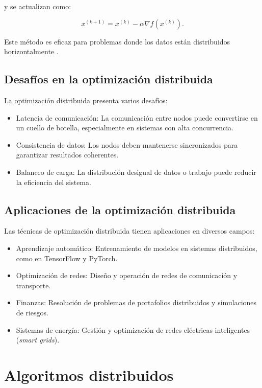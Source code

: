 \begin{itemize}
		y se actualizan como:
		
		\begin{equation}
			x^{(k+1)} = x^{(k)} - \alpha \nabla f(x^{(k)}).
		\end{equation}
		
		Este método es eficaz para problemas donde los datos están distribuidos horizontalmente \cite{recht2011hogwild}.
		
		\subsection{Desafíos en la optimización distribuida}
		
		La optimización distribuida presenta varios desafíos:
		
		\begin{itemize}
			\item Latencia de comunicación: La comunicación entre nodos puede convertirse en un cuello de botella, especialmente en sistemas con alta concurrencia.
			\item Consistencia de datos: Los nodos deben mantenerse sincronizados para garantizar resultados coherentes.
			\item Balanceo de carga: La distribución desigual de datos o trabajo puede reducir la eficiencia del sistema.
		\end{itemize}
		
		\subsection{Aplicaciones de la optimización distribuida}
		
		Las técnicas de optimización distribuida tienen aplicaciones en diversos campos:
		
		\begin{itemize}
			\item Aprendizaje automático: Entrenamiento de modelos en sistemas distribuidos, como en TensorFlow y PyTorch.
			\item Optimización de redes: Diseño y operación de redes de comunicación y transporte.
			\item Finanzas: Resolución de problemas de portafolios distribuidos y simulaciones de riesgos.
			\item Sistemas de energía: Gestión y optimización de redes eléctricas inteligentes (\textit{smart grids}).
		\end{itemize}
		\section{Algoritmos distribuidos}
		

\end{itemize}

